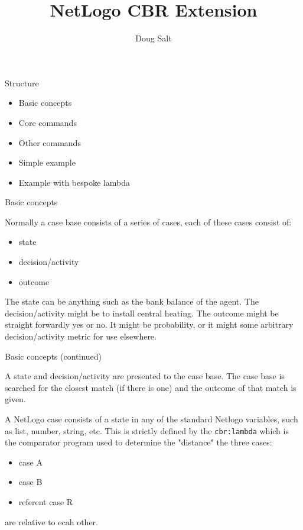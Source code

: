 \documentclass[usenames,dvipsnames,10pt]{beamer} %
\title{NetLogo CBR Extension}
\author{Doug Salt}
\institute{The James Hutton Institute}
\begin{document}
\begin{frame}[plain]
    \maketitle
\end{frame}

\begin{frame}{Structure}
    \begin{itemize}
        \item Basic concepts
        \item Core commands
        \item Other commands
        \item Simple example
        \item Example with bespoke lambda
    \end{itemize}
\end{frame}

\begin{frame}{Basic concepts}
    
    Normally a  case base consists of a series of cases, each of these cases
    consist of:

    \begin{itemize}
        \item state
        \item decision/activity
        \item outcome
    \end{itemize}

    The state can be anything such as the bank balance of the agent. The
    decision/activity might be to install central heating. The outcome might be
    straight forwardly yes or no. It might be probability, or it might some
    arbitrary decision/activity metric for use elsewhere.

\end{frame}

\begin{frame}{Basic concepts (continued)}

    A state and decision/activity are presented to the case base. The case base
    is searched for the closest match (if there is one) and the outcome of that
    match is given.

    \vspace{0.25cm}
    A NetLogo case consists of a state in any of the standard Netlogo
    variables, such as list, number, string, etc. This is strictly defined by
    the {\color{blue}\texttt{cbr:lambda}} which is the comparator program used
    to determine the "distance" the three cases:

    \begin{itemize}
		\item case A
		\item case B
		\item referent case R
    \end{itemize}

are relative to ecah other.

\end{frame}
\end{document}
